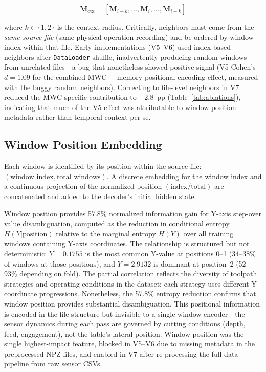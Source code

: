 \documentclass[sensors,article,submit,moreauthors,pdftex]{Definitions/mdpi}
\begin{document}
\begin{equation}
    \mathbf{M}_\text{ctx} = [\mathbf{M}_{i-k}, \ldots, \mathbf{M}_i, \ldots, \mathbf{M}_{i+k}]
\end{equation}

\noindent where $k \in \{1, 2\}$ is the context radius. Critically, neighbors must come from the \emph{same source file} (same physical operation recording) and be ordered by window index within that file. Early implementations (V5--V6) used index-based neighbors after \texttt{DataLoader} shuffle, inadvertently producing random windows from unrelated files---a bug that nonetheless showed positive signal (V5 Cohen's $d = 1.09$ for the combined MWC + memory positional encoding effect, measured with the buggy random neighbors). Correcting to file-level neighbors in V7 reduced the MWC-specific contribution to $-$2.8~pp (Table~\ref{tab:ablations}), indicating that much of the V5 effect was attributable to window position metadata rather than temporal context per se.

\subsection{Window Position Embedding}

Each window is identified by its position within the source file: $(\text{window\_index}, \text{total\_windows})$. A discrete embedding for the window index and a continuous projection of the normalized position $(\text{index}/\text{total})$ are concatenated and added to the decoder's initial hidden state.

Window position provides 57.8\% normalized information gain for Y-axis step-over value disambiguation, computed as the reduction in conditional entropy $H(Y|\text{position})$ relative to the marginal entropy $H(Y)$ over all training windows containing Y-axis coordinates. The relationship is structured but not deterministic: $Y = 0.1755$ is the most common Y-value at positions 0--1 (34--38\% of windows at those positions), and $Y = 2.9132$ is dominant at position~2 (52--93\% depending on fold). The partial correlation reflects the diversity of toolpath strategies and operating conditions in the dataset: each strategy uses different Y-coordinate progressions. Nonetheless, the 57.8\% entropy reduction confirms that window position provides substantial disambiguation. This positional information is encoded in the file structure but invisible to a single-window encoder---the sensor dynamics during each pass are governed by cutting conditions (depth, feed, engagement), not the table's lateral position. Window position was the single highest-impact feature, blocked in V5--V6 due to missing metadata in the preprocessed NPZ files, and enabled in V7 after re-processing the full data pipeline from raw sensor CSVs.
\end{document}
